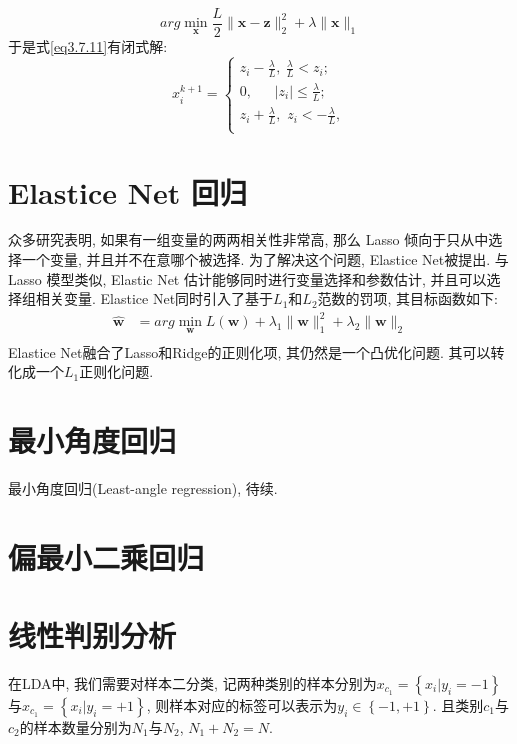 \begin{equation}
arg\underset{\boldsymbol{x}}{\min}\frac{L}{2}\lVert \boldsymbol{x}- \boldsymbol{z}\rVert _{2}^{2}+\lambda \lVert \boldsymbol{x} \rVert _1
\label{eq3.7.11}
\end{equation}
于是式\eqref{eq3.7.11}有闭式解:
\begin{equation}
x_{i}^{k+1}=\left\{ \begin{array}{l}
	z_i-\frac{\lambda}{L},\ \frac{\lambda}{L}<z_i;\\
	0,\ \ \ \ \ \ \ \left| z_i \right|\le \frac{\lambda}{L};\\
	z_i+\frac{\lambda}{L},\,\,z_i<-\frac{\lambda}{L},\\
\end{array} \right. 
\end{equation}

\section{Elastice Net 回归}
众多研究表明, 如果有一组变量的两两相关性非常高, 那么 Lasso 倾向于只从中选择一个变量, 并且并不在意哪个被选择. 为了解决这个问题, Elastice Net被提出. 与 Lasso 模型类似, Elastic Net 估计能够同时进行变量选择和参数估计, 并且可以选择组相关变量. Elastice Net同时引入了基于$L_1$和$L_2$范数的罚项,  其目标函数如下:
\begin{equation}
\begin{aligned}
\boldsymbol{\hat{w}}&=arg\underset{\boldsymbol{w}}{\min}L\left( \boldsymbol{w} \right) +\lambda_1 \lVert \boldsymbol{w} \rVert_1^2+\lambda_2 \lVert \boldsymbol{w} \rVert_2\\
\end{aligned}
\end{equation}
Elastice Net融合了Lasso和Ridge的正则化项, 其仍然是一个凸优化问题.  其可以转化成一个$L_1$正则化问题. 

\section{最小角度回归}
最小角度回归(Least-angle regression), 待续. 
\section{偏最小二乘回归}

\section{线性判别分析}
在LDA中, 我们需要对样本二分类, 记两种类别的样本分别为$x_{c_1}=\left\{x_i|y_i=-1\right\}$与$x_{c_1}=\left\{x_i|y_i=+1\right\}$, 则样本对应的标签可以表示为$y_i\in\left\{-1,+1\right\}$. 且类别$c_1$与$c_2$的样本数量分别为$N_1$与$N_2$, $N_1+N_2=N$.

